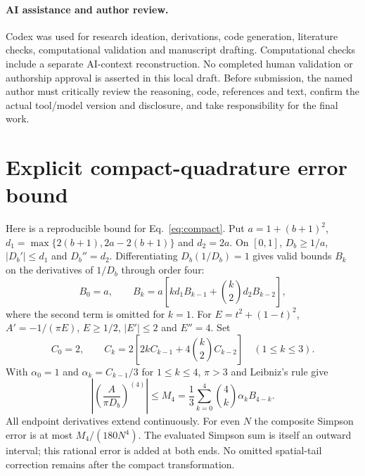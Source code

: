 \documentclass[11pt]{article}
\begin{document}
\paragraph{AI assistance and author review.}
Codex was used for research ideation, derivations, code generation, literature
checks, computational validation and manuscript drafting. Computational
checks include a separate AI-context reconstruction. No completed human
validation or authorship approval is asserted in this local draft. Before
submission, the named author must critically review the reasoning, code,
references and text, confirm the actual tool/model version and disclosure,
and take responsibility for the final work.

\appendix
\section{Explicit compact-quadrature error bound}\label{app:error}
Here is a reproducible bound for Eq.~\eqref{eq:compact}. Put
$a=1+(b+1)^2$, $d_1=\max\{2(b+1),2a-2(b+1)\}$ and $d_2=2a$.
On $[0,1]$, $D_b\ge1/a$, $|D_b'|\le d_1$ and $D_b''=d_2$.
Differentiating $D_b(1/D_b)=1$ gives valid bounds $B_k$ on the derivatives
of $1/D_b$ through order four:
\begin{equation}
 B_0=a,\qquad B_k=a\left[kd_1B_{k-1}+\binom{k}{2}d_2B_{k-2}\right],
\end{equation}
where the second term is omitted for $k=1$.
For $E=t^2+(1-t)^2$, $A'=-1/(\pi E)$, $E\ge1/2$,
$|E'|\le2$ and $E''=4$. Set
\begin{equation}
 C_0=2,\qquad C_k=2\left[2kC_{k-1}+4\binom{k}{2}C_{k-2}\right]
 \quad(1\le k\le3).
\end{equation}
With $\alpha_0=1$ and $\alpha_k=C_{k-1}/3$ for $1\le k\le4$,
$\pi>3$ and Leibniz's rule give
\begin{equation}
 \left|\left(\frac{A}{\pi D_b}\right)^{(4)}\right|
 \le M_4=\frac13\sum_{k=0}^4\binom4k\alpha_kB_{4-k}.
\end{equation}
All endpoint derivatives extend continuously. For even $N$ the composite
Simpson error is at most $M_4/(180N^4)$. The evaluated Simpson sum is itself
an outward interval; this rational error is added at both ends. No omitted
spatial-tail correction remains after the compact transformation.



\end{document}
